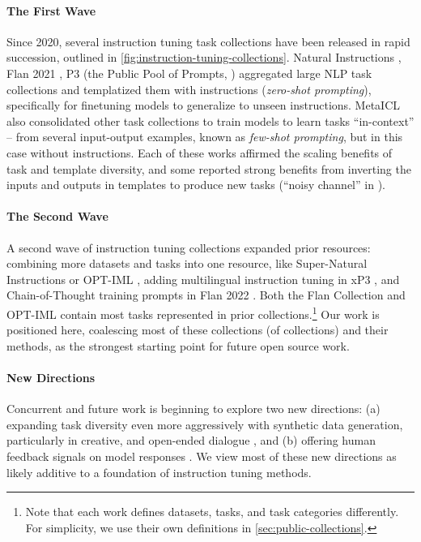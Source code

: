 \paragraph{The First Wave} Since 2020, several instruction tuning task collections have been released in rapid succession, outlined in \ref{fig:instruction-tuning-collections}.
Natural Instructions \citep{mishra2021cross}, Flan 2021 \citep{wei2021finetuned}, P3 (the Public Pool of Prompts, \citealp{bach-etal-2022-promptsource}) aggregated large NLP task collections and templatized them with instructions (\emph{zero-shot prompting}), specifically for finetuning models to generalize to unseen instructions. MetaICL \citep{min-etal-2022-metaicl} also consolidated other task collections \citep{ye2021crossfit,khashabi-etal-2020-unifiedqa} to train models to learn tasks ``in-context'' -- from several input-output examples, known as \emph{few-shot prompting}, but in this case without instructions. Each of these works affirmed the scaling benefits of task and template diversity, and some reported strong benefits from inverting the inputs and outputs in templates to produce new tasks (``noisy channel'' in \citealp{min-etal-2022-metaicl}).

\paragraph{The Second Wave} A second wave of instruction tuning collections expanded prior resources: combining more datasets and tasks into one resource, like Super-Natural Instructions \citep{wang2022benchmarking} or OPT-IML \citep{iyer2022optiml}, adding multilingual instruction tuning in xP3 \citep{muennighoff2022crosslingual}, and Chain-of-Thought training prompts in Flan 2022 \citep{chung2022scaling}. Both the Flan Collection and OPT-IML contain most tasks represented in prior collections.\footnote{Note that each work defines datasets, tasks, and task categories differently. For simplicity, we use their own definitions in \ref{sec:public-collections}.}
Our work is positioned here, coalescing most of these collections (of collections) and their methods, as the strongest starting point for future open source work.

\paragraph{New Directions} Concurrent and future work is beginning to explore two new directions: (a) expanding task diversity even more aggressively with synthetic data generation, particularly in creative, and open-ended dialogue \citep{selfinstruct2022, honovich2022unnatural, ye2022guess, gupta2022improving}, and (b) offering human feedback signals on model responses \citep{ouyang2022training, glaese2022improving, bai2022training, nakano2021webgpt, bai2022constitutional}. We view most of these new directions as likely additive to a foundation of instruction tuning methods.


